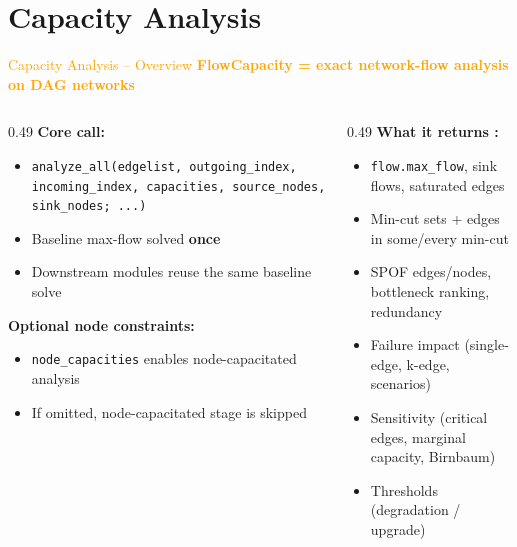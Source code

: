 \documentclass[aspectratio=169]{beamer}
\begin{document}
\section{Capacity Analysis}
\begin{frame}{\textcolor{orange}{Capacity Analysis – Overview}}
\textbf{\textcolor{orange}{FlowCapacity = exact network-flow analysis on DAG networks}}

\vspace{0.25cm}
\begin{columns}[T]
\begin{column}{0.49\textwidth}
\textbf{Core call:}
\begin{itemize}
  \item \texttt{analyze\_all(edgelist, outgoing\_index, incoming\_index, capacities, source\_nodes, sink\_nodes; ...)}
  \item Baseline max-flow solved \textbf{once}
  \item Downstream modules reuse the same baseline solve
\end{itemize}

\textbf{Optional node constraints:}
\begin{itemize}
  \item \texttt{node\_capacities} enables node-capacitated analysis
  \item If omitted, node-capacitated stage is skipped
\end{itemize}
\end{column}
\begin{column}{0.49\textwidth}
\textbf{What it returns :}
\begin{itemize}
  \item \texttt{flow.max\_flow}, sink flows, saturated edges
  \item Min-cut sets + edges in some/every min-cut
  \item SPOF edges/nodes, bottleneck ranking, redundancy
  \item Failure impact (single-edge, k-edge, scenarios)
  \item Sensitivity (critical edges, marginal capacity, Birnbaum)
  \item Thresholds (degradation / upgrade)
\end{itemize}
\end{column}
\end{columns}


\end{frame}
\end{document}
